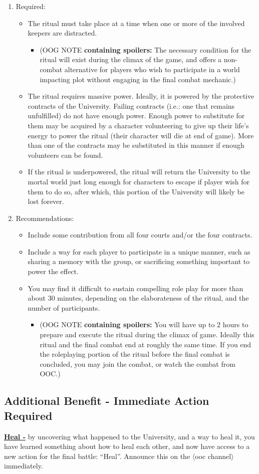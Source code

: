 \documentclass[white]{gl2018}
\begin{document}
\begin{enumerate}
\item Required:
\begin{itemize}
\item The ritual must take place at a time when one or more of the involved keepers are distracted.
\begin{itemize}
\item (OOG NOTE {\bf containing spoilers:} The necessary condition for the ritual will exist during the climax of the game, and offers a non-combat alternative for players who wish to participate in a world impacting plot without engaging in the final combat mechanic.)
\end{itemize}
\item The ritual requires massive power. Ideally, it is powered by the protective contracts of the University. Failing contracts (i.e.: one that remains unfulfilled) do not have enough power. Enough power to substitute for them may be acquired by a character volunteering to give up their life’s energy to power the ritual (their character will die at end of game). More than one of the contracts may be substituted in this manner if enough volunteers can be found.
\item If the ritual is underpowered, the ritual will return the University to the mortal world just long enough for characters to escape if player wish for them to do so, after which, this portion of the University will likely be lost forever.
\end{itemize}
\item Recommendations:
\begin{itemize}
\item Include some contribution from all four courts and/or the four contracts.
\item Include a way for each player to participate in a unique manner, such as sharing a memory with the group, or sacrificing something important to power the effect.
\item You may find it difficult to sustain compelling role play for more than about 30 minutes, depending on the elaborateness of the ritual, and the number of participants. 
\begin{itemize}
\item (OOG NOTE {\bf containing spoilers:} You will have up to 2 hours to prepare and execute the ritual during the climax of game. Ideally this ritual and the final combat end at roughly the same time. If you end the roleplaying portion of the ritual before the final combat is concluded, you may join the combat, or watch the combat from OOC.)
\end{itemize}
\end{itemize}
\end{enumerate}

\subsection*{Additional Benefit - Immediate Action Required}
\underline{{\bf Heal -}} by uncovering what happened to the University, and a way to heal it, you have learned something about how to heal each other, and now have access to a new action for the final battle: ``Heal''. Announce this on the $\langle$ooc channel$\rangle$ immediately.
\end{document}
